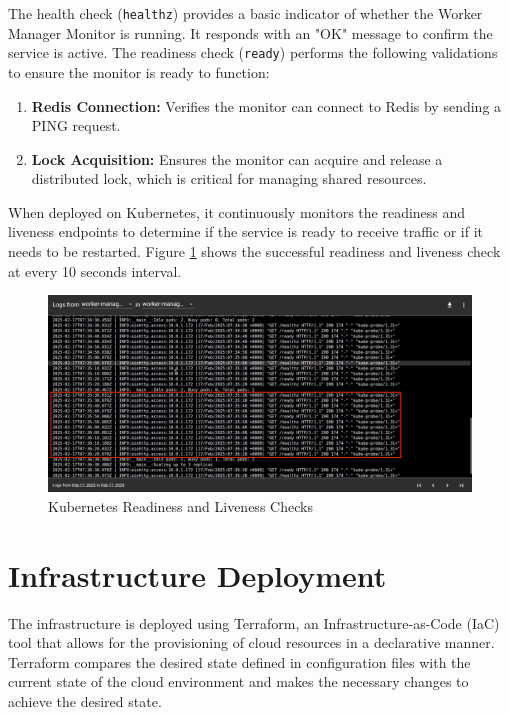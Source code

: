 The health check (\texttt{healthz}) provides a basic indicator of whether the Worker Manager Monitor is running. It responds with an "OK" message to confirm the service is active.
The readiness check (\texttt{ready}) performs the following validations to ensure the monitor is ready to function:
\begin{enumerate}
    \item \textbf{Redis Connection:} Verifies the monitor can connect to Redis by sending a PING request.
    \item \textbf{Lock Acquisition:} Ensures the monitor can acquire and release a distributed lock, which is critical for managing shared resources.
\end{enumerate}

When deployed on Kubernetes, it continuously monitors the readiness and liveness endpoints to determine if the service is ready to receive traffic or if it needs to be restarted. Figure \ref{fig:k8s_healthcheck} shows the successful readiness and liveness check at every 10 seconds interval.

\begin{figure}[ht]
  \centering
  \includegraphics[width=\textwidth]{figures/k8s_healthcheck.png}
  \caption{Kubernetes Readiness and Liveness Checks}
  \label{fig:k8s_healthcheck}
\end{figure}

\section{Infrastructure Deployment}
The infrastructure is deployed using Terraform, an Infrastructure-as-Code (IaC) tool that allows for the provisioning of cloud resources in a declarative manner. Terraform compares the desired state defined in configuration files with the current state of the cloud environment and makes the necessary changes to achieve the desired state.

